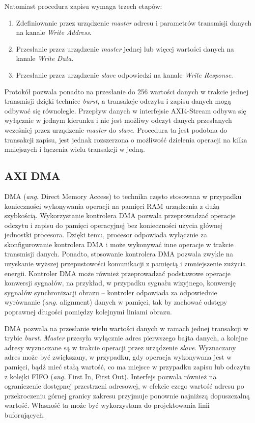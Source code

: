 Natomiast procedura zapisu wymaga trzech etapów:
\begin{enumerate}
	\item Zdefiniowanie  przez urządzenie \emph{master} adresu i parametrów transmisji danych na kanale \emph{Write Address}.
	\item Przesłanie przez urządzenie \emph{master} jednej lub więcej wartości danych na kanale \emph{Write Data}.
	\item Przesłanie przez urządzenie \emph{slave} odpowiedzi na kanale \emph{Write Response}.
\end{enumerate}

Protokół pozwala ponadto na przesłanie do 256 wartości danych w trakcie jednej transmisji dzięki technice \emph{burst}, a transakcje odczytu i zapisu danych mogą odbywać się równolegle.
Przepływ danych w interfejsie AXI4-Stream odbywa się wyłącznie w jednym kierunku i nie jest możliwy odczyt danych przesłanych wcześniej przez urządzenie \emph{master} do \emph{slave}. 
Procedura ta jest podobna do transakcji zapisu, jest jednak rozszerzona o możliwość dzielenia operacji na kilka mniejszych i łączenia wielu transakcji w jedną.

\subsection{AXI DMA}

DMA (\emph{ang.} Direct Memory Access) to technika często stosowana w przypadku konieczności wykonywania operacji na pamięci RAM urządzenia z dużą szybkością. 
Wykorzystanie kontrolera DMA pozwala przeprowadzać operacje odczytu i zapisu do pamięci operacyjnej bez konieczności użycia głównej jednostki procesora. 
Dzięki temu, procesor odpowiada wyłącznie za skonfigurowanie kontrolera DMA i może wykonywać inne operacje w trakcie transmisji danych. 
Ponadto, stosowanie kontrolera DMA pozwala zwykle na uzyskanie wyższej przepustowości komunikacji z pamięcią i zmniejszenie zużycia energii.
Kontroler DMA może również przeprowadzać podstawowe operacje konwersji sygnałów, na przykład, w przypadku sygnału wizyjnego, konwersję sygnałów synchronizacji obrazu -- kontroler odpowiada za odpowiednie wyrównanie (\emph{ang.} alignment) danych w pamięci, tak by zachować odstępy poprawnej długości pomiędzy kolejnymi liniami obrazu. 

DMA pozwala na przesłanie wielu wartości danych w ramach jednej transakcji w trybie \emph{burst}. 
\emph{Master} przesyła wyłącznie adres pierwszego bajta danych, a kolejne adresy wyznaczane są w trakcie operacji przez urządzenie \emph{slave}.
Wyznaczany adres może być zwiększany, w przypadku, gdy operacja wykonywana jest w pamięci, bądź mieć stałą wartość, co ma miejsce w przypadku zapisu lub odczytu z kolejki FIFO (\emph{ang.} First In, First Out). 
Interfejs pozwala również na ograniczenie dostępnej przestrzeni adresowej, w efekcie czego wartość adresu po przekroczeniu górnej granicy zakresu przyjmuje ponownie najniższą dopuszczalną wartość. 
Własność ta może być wykorzystana do projektowania linii buforujących.

